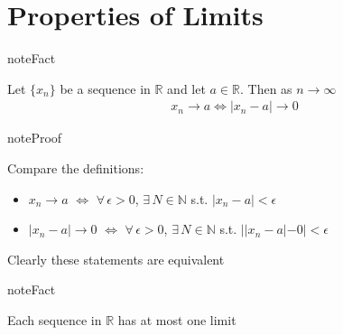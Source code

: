 \documentclass[letterpaper,10pt,english]{jupyterBook}
\begin{document}
\section{Properties of Limits}
\label{\detokenize{04.basic_analysis:properties-of-limits}}
\begin{sphinxadmonition}{note}{Fact}

\sphinxAtStartPar
Let \(\{x_n\}\) be a sequence in \(\mathbb{R}\) and let \(a \in \mathbb{R}\).
Then as \(n \to \infty\)
\begin{equation*}
\begin{split}
x_n \to a \iff |x_n - a| \to 0
\end{split}
\end{equation*}\end{sphinxadmonition}

\begin{sphinxadmonition}{note}{Proof}

\sphinxAtStartPar
Compare the definitions:
\begin{itemize}
\item {} 
\sphinxAtStartPar
\(x_n \to a\) \(\iff\) \(\forall \, \epsilon > 0\), \(\exists \, N \in
\mathbb{N}\) s.t. \(|x_n - a| < \epsilon\)

\item {} 
\sphinxAtStartPar
\(|x_n - a| \to 0\) \(\iff\) \(\forall \, \epsilon > 0\), \(\exists \, N \in
\mathbb{N}\) s.t. \(||x_n - a| - 0| < \epsilon\)

\end{itemize}

\sphinxAtStartPar
Clearly these statements are equivalent
\end{sphinxadmonition}

\begin{sphinxadmonition}{note}{Fact}

\sphinxAtStartPar
Each sequence in \(\mathbb{R}\) has at most one limit
\end{sphinxadmonition}
\end{document}
